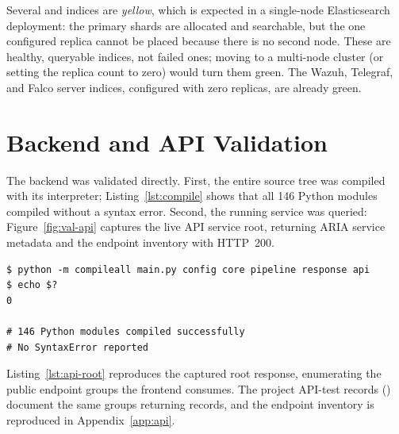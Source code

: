 
Several  and  indices are \emph{yellow}, which is expected in a single-node Elasticsearch deployment: the primary shards are allocated and searchable, but the one configured replica cannot be placed because there is no second node. These are healthy, queryable indices, not failed ones; moving to a multi-node cluster (or setting the replica count to zero) would turn them green. The Wazuh, Telegraf, and Falco server indices, configured with zero replicas, are already green.

\section{Backend and API Validation}
\label{sec:val-backend}

The backend was validated directly. First, the entire source tree was compiled with its interpreter; Listing~\ref{lst:compile} shows that all 146 Python modules compiled without a syntax error. Second, the running service was queried: Figure~\ref{fig:val-api} captures the live API service root, returning ARIA service metadata and the endpoint inventory with HTTP~200.

\begin{lstlisting}[style=ariaterm,caption={Backend compilation check (real executed evidence)},label={lst:compile}]
$ python -m compileall main.py config core pipeline response api
$ echo $?
0

# 146 Python modules compiled successfully
# No SyntaxError reported
\end{lstlisting}


Listing~\ref{lst:api-root} reproduces the captured root response, enumerating the public endpoint groups the frontend consumes. The project API-test records () document the same groups returning records, and the endpoint inventory is reproduced in Appendix~\ref{app:api}.

